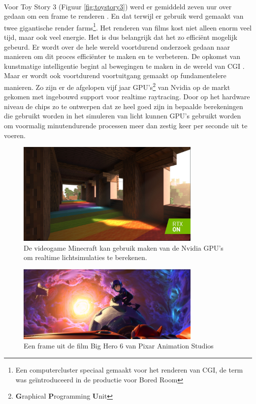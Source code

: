 \documentclass[12pt, a4paper]{article}
\begin{document}
\paragraph{}
Voor Toy Story 3 (Figuur \ref{fig:toystory3}) werd er gemiddeld zeven uur over gedaan om een frame te renderen \cite{HowToyStory3WasMade}. En dat terwijl er gebruik werd gemaakt van twee gigantische render farms\footnote{Een computercluster speciaal gemaakt voor het renderen van CGI, de term was geïntroduceerd in de productie voor Bored Room\cite{MakingOfBoredRoom}}. Het renderen van films kost niet alleen enorm veel tijd, maar ook veel energie. Het is dus belangrijk dat het zo efficiënt mogelijk gebeurd. Er wordt over de hele wereld voortdurend onderzoek gedaan naar manieren om dit proces efficiënter te maken en te verbeteren. De opkomst van kunstmatige intelligentie begint al bewegingen te maken in de wereld van CGI \cite{NeRFactor}. Maar er wordt ook voortdurend voortuitgang gemaakt op fundamentelere manieren. Zo zijn er de afgelopen vijf jaar GPU's\footnote{\textbf{G}raphical \textbf{P}rogramming \textbf{U}nit} van Nvidia op de markt gekomen met ingebouwd support voor realtime raytracing\cite{NvidiaRTX}. Door op het hardware niveau de chips zo te ontwerpen dat ze heel goed zijn in bepaalde berekeningen die gebruikt worden in het simuleren van licht kunnen GPU's gebruikt worden om voormalig minutendurende processen meer dan zestig keer per seconde uit te voeren. 
\begin{figure}[h]
    \centering
    \includegraphics[width=0.8\textwidth]{minecraftrtx.jpg}
    \caption{De videogame Minecraft kan gebruik maken van de Nvidia GPU's om realtime lichtsimulaties te berekenen.}
    \label{fig:minecraftrtx}
\end{figure}
\begin{figure}[h]
    \centering
    \includegraphics[width=0.8\textwidth]{bighero6.png}
    \caption{Een frame uit de film Big Hero 6 van Pixar Animation Studios}
    \label{fig:bighero6}
\end{figure}
\end{document}
